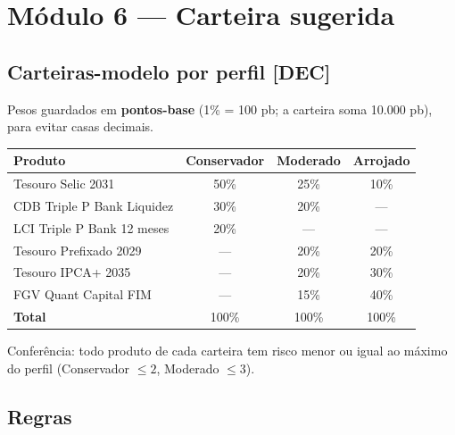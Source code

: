 \documentclass[11pt,a4paper]{article}
\newcommand{\banco}{Triple P Bank}            %
\newcommand{\fundo}{FGV Quant Capital}     %
\newcommand{\dec}{\textbf{[DEC]}}          %
\begin{document}
\section{Módulo 6 --- Carteira sugerida}

\subsection{Carteiras-modelo por perfil \dec}

Pesos guardados em \textbf{pontos-base} (1\% = 100 pb; a carteira soma 10.000 pb), para evitar
casas decimais.

\begin{center}
\begin{tabular}{@{}lccc@{}}
\toprule
\textbf{Produto} & \textbf{Conservador} & \textbf{Moderado} & \textbf{Arrojado} \\
\midrule
Tesouro Selic 2031 & 50\% & 25\% & 10\% \\
CDB \banco{} Liquidez & 30\% & 20\% & --- \\
LCI \banco{} 12 meses & 20\% & --- & --- \\
Tesouro Prefixado 2029 & --- & 20\% & 20\% \\
Tesouro IPCA+ 2035 & --- & 20\% & 30\% \\
\fundo{} FIM & --- & 15\% & 40\% \\
\midrule
\textbf{Total} & 100\% & 100\% & 100\% \\
\bottomrule
\end{tabular}
\end{center}

Conferência: todo produto de cada carteira tem risco menor ou igual ao máximo do perfil
(Conservador $\le 2$, Moderado $\le 3$).

\subsection{Regras}
\end{document}
